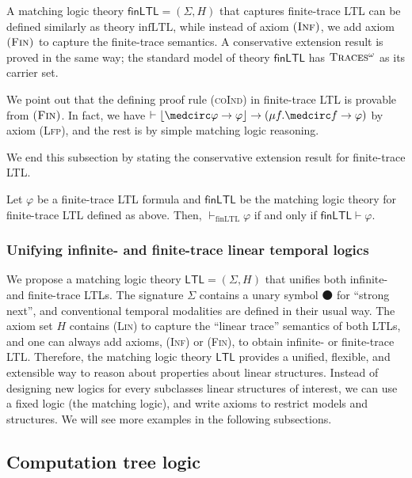 \documentclass[acmsmall,review,anonymous]{acmart}
\newcommand{\imp}{\to}
\newcommand{\sig}{\mathbb{\Sigma}}
\newcommand{\MLLTL}{\mathsf{LTL}}
\newcommand{\MLfinLTL}{\mathsf{finLTL}}
\DeclarePairedDelimiter{\floor}{\lfloor}{\rfloor}
\newcommand{\infLTL}{\mathrm{infLTL}}
\newcommand{\finLTL}{\mathrm{finLTL}}
\newcommand{\prule}[1]{\textsc{(#1)}}
\newcommand{\Lfp}{\prule{Lfp}\xspace}
\newcommand{\wnext}{{\medcirc}}
\newcommand{\snext}{{\medbullet}}
\newcommand{\infTraces}{\textsc{Traces$^\omega$}\xspace}
\newcommand{\Inf}{\prule{Inf}\xspace}
\newcommand{\Fin}{\prule{Fin}\xspace}
\newcommand{\Lin}{\prule{Lin}\xspace}
\begin{document}
A matching logic theory $\MLfinLTL = (\sig, H)$ that captures finite-trace LTL
can be defined similarly as theory $\infLTL$,
while instead of axiom $\Inf$, we add axiom $\Fin$ to capture the finite-trace semantics.
A conservative extension result is proved in the same way;
the standard model of theory $\MLfinLTL$ has $\infTraces$ as its carrier set.

We point out that the defining proof rule \prule{coInd} in finite-trace LTL
is provable from $\Fin$.
In fact, we have 
$\vdash \floor{\wnext \varphi \imp \varphi} \imp (\mu f . \wnext f \imp \varphi)$
by axiom \Lfp,
and the rest is by simple matching logic reasoning.

We end this subsection by stating the conservative extension result for
finite-trace LTL.

\begin{theorem}
\label{thm_csrvext_finLTL}
Let  $\varphi$ be a finite-trace LTL formula
and $\MLfinLTL$ be the matching logic theory for finite-trace LTL defined as above.
Then,  $\vdash_\finLTL \varphi$ if and only if
$\MLfinLTL \vdash \varphi$.
\end{theorem}

\subsubsection{Unifying infinite- and finite-trace linear temporal logics}

We propose a matching logic theory $\MLLTL = (\sig, H)$ that unifies both
infinite- and finite-trace LTLs.
The signature $\sig$ contains a unary symbol $\snext$ for ``strong next'',
and conventional temporal modalities are defined in their usual way.
The axiom set $H$ contains \Lin to capture the ``linear trace'' semantics
of both LTLs, and one can always add axioms, \Inf or \Fin, to obtain
infinite- or finite-trace LTL.
Therefore, the matching logic theory $\MLLTL$ provides a unified, flexible, and extensible
way to reason about properties about linear structures.
Instead of designing new logics for every subclasses linear structures of interest, 
we can use a fixed logic (the matching logic), and 
write axioms to restrict models and structures.
We will see more examples in the following subsections.

\subsection{Computation tree logic}
\label{sec_CTL}
\end{document}
